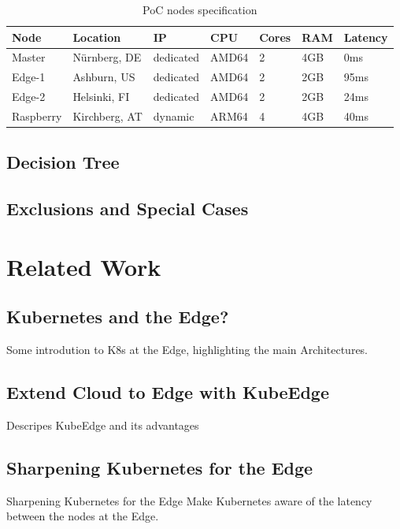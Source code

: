 \documentclass[MSC,Master,english]{twbook}%
\begin{document}
\begin{table}[ht]
    \begin{center}
        \begin{tabular}{|l|l|l|l|l|l|l|}
            \hline
            Node & Location & IP & CPU & Cores & RAM & Latency \\
            \hline
            Master & Nürnberg, DE & dedicated & AMD64 & 2 & 4GB & 0ms \\
            Edge-1 & Ashburn, US & dedicated & AMD64 & 2 & 2GB & 95ms \\
            Edge-2 & Helsinki, FI &  dedicated & AMD64 & 2 & 2GB & 24ms \\
            Raspberry & Kirchberg, AT & dynamic & ARM64 & 4 & 4GB & 40ms \\
            \hline
        \end{tabular}
        \caption{\ac{PoC} nodes specification}
        \label{tab:poc-nodes}
    \end{center}
\end{table}


\section{Decision Tree}
\label{sec:tree}


\section{Exclusions and Special Cases}
\label{sec:exclusions}




\chapter{Related Work}
\label{chap:related}
\section{Kubernetes and the Edge?}
Some introdution to K8s at the Edge, highlighting the main Architectures.
\section{Extend Cloud to Edge with KubeEdge}
Descripes KubeEdge and its advantages
\section{Sharpening Kubernetes for the Edge}
Sharpening Kubernetes for the Edge
Make Kubernetes aware of the latency between the nodes at the Edge.
\end{document}
